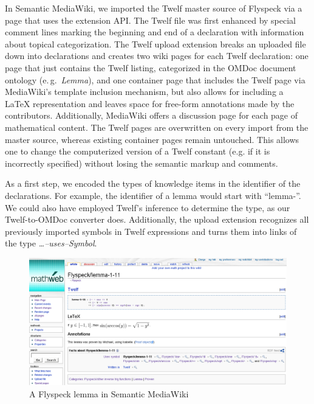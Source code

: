 In Semantic MediaWiki, we imported the Twelf master source of Flyspeck
via a page that uses the 
extension API.  The Twelf file was first enhanced by
special comment lines marking the beginning and end of a
declaration with information about topical
categorization.  The Twelf upload extension breaks an uploaded file
down into declarations and creates two wiki pages for each Twelf
declaration: one page that just contains the Twelf listing,
categorized in the OMDoc document ontology
(e.\,g.\ \textit{Lemma}), and one container page that includes the
Twelf page via MediaWiki's template inclusion mechanism, but also
allows for including a {\LaTeX} representation and leaves space for
free-form annotations made by the contributors.
Additionally, MediaWiki offers a discussion page for each page of mathematical content. 
The
Twelf pages are overwritten on every import from the master source,
whereas existing container pages remain untouched.  This allows 
one to change the computerized version of a Twelf constant (e.g. if
it is incorrectly specified) without losing the semantic markup and
comments. 

As a first step, we encoded the types of knowledge items in the identifier of
the declarations.  For example, the identifier of a lemma would start with ``lemma-''.  We
could also have employed Twelf's inference to determine the
type, as our Twelf-to-OMDoc converter does.  Additionally, the upload
extension recognizes all previously imported symbols in Twelf expressions and
turns them into links of the type \textit{\ldots--uses--Symbol}.

\begin{figure}
  \centering
  \includegraphics[width=\textwidth]{images/smw-lemma}
  \caption[A Flyspeck lemma in Semantic MediaWiki]{A Flyspeck lemma in Semantic
    MediaWiki\protect\footnotemark}
  \label{fig:smw-lemma}
\end{figure}
\addtocounter{footnote}{-1}

